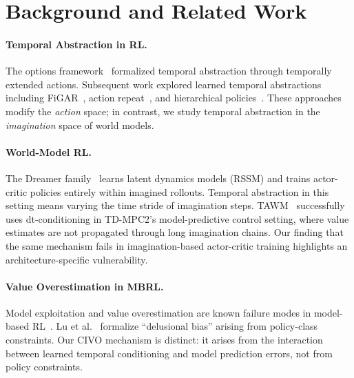\documentclass[10pt,letterpaper]{article}
\begin{document}
\section{Background and Related Work}
\label{sec:related}

\paragraph{Temporal Abstraction in RL.}
The options framework~\citep{sutton1999options} formalized temporal abstraction through temporally extended actions.
Subsequent work explored learned temporal abstractions including FiGAR~\citep{sharma2017figar}, action repeat~\citep{lakshminarayanan2017dynamic}, and hierarchical policies~\citep{vezhnevets2017feudal,nachum2018hiro}.
These approaches modify the \emph{action} space; in contrast, we study temporal abstraction in the \emph{imagination} space of world models.

\paragraph{World-Model RL.}
The Dreamer family~\citep{hafner2020dreamerv1,hafner2021dreamerv2,hafner2023dreamerv3} learns latent dynamics models (RSSM) and trains actor-critic policies entirely within imagined rollouts.
Temporal abstraction in this setting means varying the time stride of imagination steps.
TAWM~\citep{nhu2025tawm} successfully uses dt-conditioning in TD-MPC2's model-predictive control setting, where value estimates are not propagated through long imagination chains.
Our finding that the same mechanism fails in imagination-based actor-critic training highlights an architecture-specific vulnerability.

\paragraph{Value Overestimation in MBRL.}
Model exploitation and value overestimation are known failure modes in model-based RL~\citep{janner2019mbpo,chua2018pets}.
Lu et al.~\citep{lu2018nondelusional} formalize ``delusional bias'' arising from policy-class constraints.
Our CIVO mechanism is distinct: it arises from the interaction between learned temporal conditioning and model prediction errors, not from policy constraints.

\end{document}
